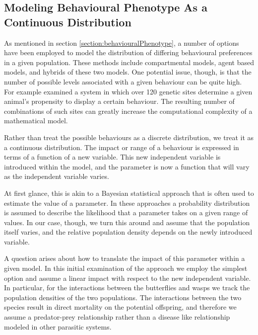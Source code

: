 \documentclass[review,authoryear]{elsarticle}
\begin{document}
\subsection{Modeling Behavioural Phenotype As a Continuous
  Distribution}

As mentioned in section \ref{section:behaviouralPhenotype}, a number
of options have been employed to model the distribution of differing behavioural
preferences in a given population. These methods include compartmental
models, agent based models, and hybrids of these two models. One
potential issue, though, is that the number of possible levels associated with a given behaviour can be quite
high. For example \cite{doi:10.1111/mec.14878} examined a system in
which over 120 genetic sites determine a given animal's 
propensity to display a certain behaviour. The resulting number of
combinations of such sites can greatly increase the computational complexity of a mathematical model.

Rather than treat the possible behaviours as a discrete distribution, 
we treat it as a continuous distribution. The impact or range of a behaviour is expressed in terms of a function of a new variable. This new independent
variable is introduced within the model, and the parameter is now a
function that will vary as the independent variable varies.

At first glance, this is akin to a Bayesian statistical approach that
is often used to estimate the value of a
parameter\citep{doi:10.1111/j.1467-9868.2007.00610.x,Fitzpatrick_1991}. In
these approaches a probability distribution is assumed to describe the
likelihood that a parameter takes on a given range of values. In our
case, though, we turn this around and assume that the population
itself varies, and the relative population density depends on the newly introduced
variable.

A question arises about how to translate the impact of this parameter
within a given model. In this initial examination of the approach we
employ the simplest option and assume a linear impact with respect to
the new independent variable. In particular, for the interactions
between the butterflies and wasps we track the population densities of
the two populations. The interactions between the two species result
in direct mortality on the potential offspring, and therefore we assume a
predator-prey relationship rather than a disease like relationship
modeled in other parasitic systems. 
\end{document}
